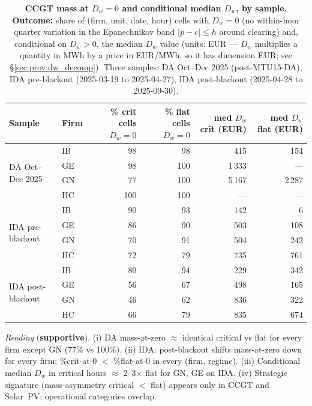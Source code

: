 \documentclass[11pt,a4paper]{article}
\begin{document}
\begin{table}[H]
\centering\scriptsize
\caption{\textbf{CCGT mass at $D_w = 0$ and conditional median $D_w$, by sample.} \textbf{Outcome:} share of (firm, unit, date, hour) cells with $D_w = 0$ (no within-hour quarter variation in the Epanechnikov band $|p-c| \le h$ around clearing) and, conditional on $D_w > 0$, the median $D_w$ value (units: EUR --- $D_w$ multiplies a quantity in MWh by a price in EUR/MWh, so it has dimension EUR; see \S\ref{sec:prov:dw_decomp}). Three samples: DA Oct--Dec 2025 (post-MTU15-DA), IDA pre-blackout (2025-03-19 to 2025-04-27), IDA post-blackout (2025-04-28 to 2025-09-30).}
\label{tab:dw_mass_median}
\setlength{\tabcolsep}{4pt}
\begin{tabular}{l l r r r r}
\toprule
Sample & Firm & \% crit cells $D_w {=} 0$ & \% flat cells $D_w {=} 0$ & med $D_w$ crit (EUR) & med $D_w$ flat (EUR) \\
\midrule
\multirow{4}{*}{DA Oct--Dec 2025} & IB &  98 &  98 &   415 &   154 \\
                                  & GE &  98 & 100 & 1\,333 &  --- \\
                                  & GN &  77 & 100 & 5\,167 & 2\,287 \\
                                  & HC & 100 & 100 &  ---  &  --- \\
\midrule
\multirow{4}{*}{IDA pre-blackout} & IB &  90 &  93 &  142 &     6 \\
                                  & GE &  86 &  90 &  503 &   108 \\
                                  & GN &  70 &  91 &  504 &   242 \\
                                  & HC &  72 &  79 &  735 &   761 \\
\midrule
\multirow{4}{*}{IDA post-blackout}& IB &  80 &  94 &  229 &   342 \\
                                  & GE &  56 &  67 &  498 &   165 \\
                                  & GN &  46 &  62 &  836 &   322 \\
                                  & HC &  66 &  79 &  835 &   674 \\
\bottomrule
\end{tabular}
\end{table}

\textit{Reading} (\textbf{supportive}). (i) DA mass-at-zero $\approx$ identical critical vs flat for every firm except GN (77\% vs 100\%). (ii) IDA: post-blackout shifts mass-at-zero down for every firm; \%crit-at-0 $<$ \%flat-at-0 in every (firm, regime). (iii) Conditional median $D_w$ in critical hours $\approx$ 2--3$\times$ flat for GN, GE on IDA. (iv) Strategic signature (mass-asymmetry critical $<$ flat) appears only in CCGT and Solar~PV; operational categories overlap.
\end{document}
